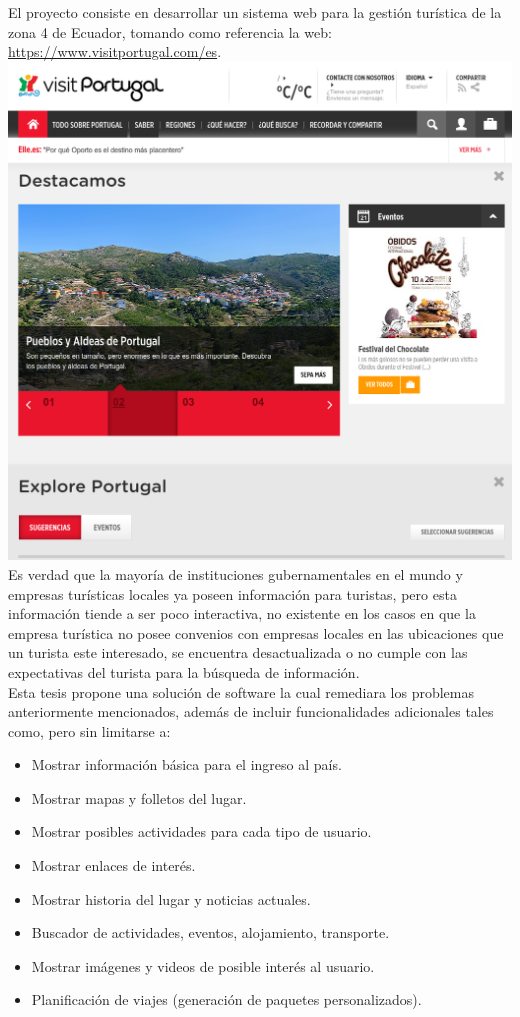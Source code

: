 \documentclass{article}
\begin{document}
El proyecto consiste en desarrollar un sistema web para la gestión turística de
la zona 4 de Ecuador, tomando como referencia la web:
\url{https://www.visitportugal.com/es}.\\
\includegraphics[width=\textwidth,height=\textheight,keepaspectratio]{visit-portugal-site.png}
Es verdad que la mayoría de instituciones gubernamentales en el mundo y empresas
turísticas locales ya poseen información para turistas, pero esta información
tiende a ser poco interactiva, no existente en los casos en que la empresa turística
no posee convenios con empresas locales en las ubicaciones que un turista este interesado,
se encuentra desactualizada o no cumple con las expectativas del turista para
la búsqueda de información.\\
Esta tesis propone una solución de software la cual remediara los problemas
anteriormente mencionados, además de incluir funcionalidades adicionales tales como,
pero sin limitarse a:
\begin{itemize}
    \item{Mostrar información básica para el ingreso al país.}
    \item{Mostrar mapas y folletos del lugar.}
    \item{Mostrar posibles actividades para cada tipo de usuario.}
    \item{Mostrar enlaces de interés.}
    \item{Mostrar historia del lugar y noticias actuales.}
    \item{Buscador de actividades, eventos, alojamiento, transporte.}
    \item{Mostrar imágenes y videos de posible interés al usuario.}
    \item{Planificación de viajes (generación de paquetes personalizados).}
\end{itemize}
\end{document}
